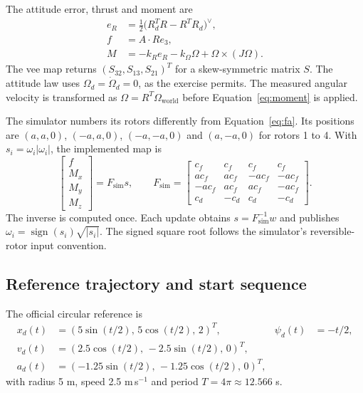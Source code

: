 \documentclass[12pt,a4paper,twoside]{article}
\begin{document}
The attitude error, thrust and moment are
\begin{align}
 e_R&=\tfrac12\bigl(R_d^TR-R^TR_d\bigr)^\vee,\\
 f&=A\cdot Re_3,\\
 M&=-k_R e_R-k_\Omega\Omega+\Omega\times(J\Omega).
 \label{eq:moment}
\end{align}
The vee map returns $(S_{32},S_{13},S_{21})^T$ for a skew-symmetric matrix $S$. The attitude law uses $\Omega_d=\dot\Omega_d=0$, as the exercise permits. The measured angular velocity is transformed as $\Omega=R^T\Omega_{\mathrm{world}}$ before Equation~\eqref{eq:moment} is applied.

The simulator numbers its rotors differently from Equation~\eqref{eq:fa}. Its positions are $(a,a,0)$, $(-a,a,0)$, $(-a,-a,0)$ and $(a,-a,0)$ for rotors 1 to 4. With $s_i=\omega_i|\omega_i|$, the implemented map is
\begin{equation}
 \begin{bmatrix}f\\M_x\\M_y\\M_z\end{bmatrix}
 =F_{\mathrm{sim}}s,\qquad
 F_{\mathrm{sim}}=\begin{bmatrix}
 c_f&c_f&c_f&c_f\\
 ac_f&ac_f&-ac_f&-ac_f\\
 -ac_f&ac_f&ac_f&-ac_f\\
 c_d&-c_d&c_d&-c_d
 \end{bmatrix}.
 \label{eq:fsim}
\end{equation}
The inverse is computed once. Each update obtains $s=F_{\mathrm{sim}}^{-1}w$ and publishes $\omega_i=\operatorname{sign}(s_i)\sqrt{|s_i|}$. The signed square root follows the simulator's reversible-rotor input convention.

\subsection{Reference trajectory and start sequence}
The official circular reference is
\begin{align}
 x_d(t)&=(5\sin(t/2),\,5\cos(t/2),\,2)^T, & \psi_d(t)&=-t/2,\\
 v_d(t)&=(2.5\cos(t/2),\,-2.5\sin(t/2),\,0)^T,\\
 a_d(t)&=(-1.25\sin(t/2),\,-1.25\cos(t/2),\,0)^T,
\end{align}
with radius 5 m, speed 2.5 m\,s$^{-1}$ and period $T=4\pi\approx12.566$ s.
\end{document}
